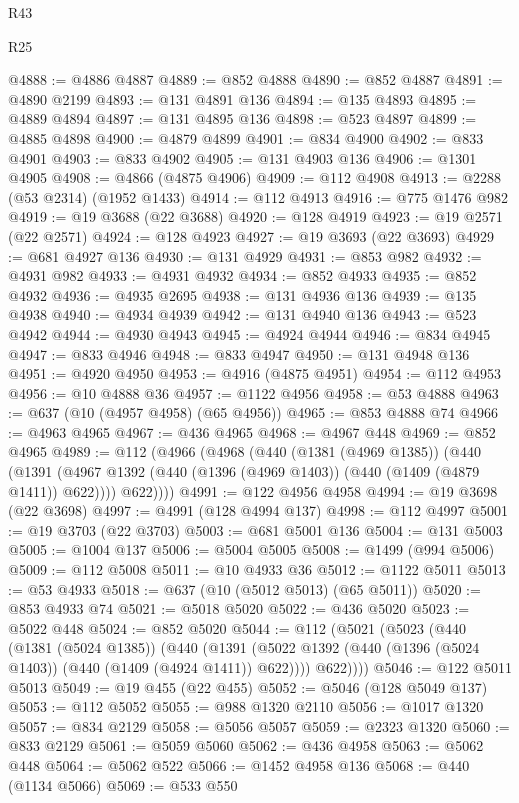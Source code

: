 \begin{lexlean}{R43}
\begin{lexlean}{R25}
\begin{coremodule}
{{{{{{{{{{{{{{{{{{{{{{{{{{{{{{{{{{{{{{{{{{{{{{{{{{{{{{{{{{{{{{{{{{{{{{{{{{{{{{{{{{{{{{{{{{{{{{{{{{{{{{{{{{{{{{{{{{{{{{{{{{{{{{{{{{{{{{{{{{{{{{{{{{{{{{{{{{{{{{{{{{{{{{{{{{{{{{{{{{{{{{{{{{{{{{{{{@4888 := @4886 @4887
@4889 := @852 @4888
@4890 := @852 @4887
@4891 := @4890 @2199
@4893 := @131 @4891 @136
@4894 := @135 @4893
@4895 := @4889 @4894
@4897 := @131 @4895 @136
@4898 := @523 @4897
@4899 := @4885 @4898
@4900 := @4879 @4899
@4901 := @834 @4900
@4902 := @833 @4901
@4903 := @833 @4902
@4905 := @131 @4903 @136
@4906 := @1301 @4905
@4908 := @4866 (@4875 @4906)
@4909 := @112 @4908
@4913 := @2288 (@53 @2314) (@1952 @1433)
@4914 := @112 @4913
@4916 := @775 @1476 @982
@4919 := @19 @3688 (@22 @3688)
@4920 := @128 @4919
@4923 := @19 @2571 (@22 @2571)
@4924 := @128 @4923
@4927 := @19 @3693 (@22 @3693)
@4929 := @681 @4927 @136
@4930 := @131 @4929
@4931 := @853 @982
@4932 := @4931 @982
@4933 := @4931 @4932
@4934 := @852 @4933
@4935 := @852 @4932
@4936 := @4935 @2695
@4938 := @131 @4936 @136
@4939 := @135 @4938
@4940 := @4934 @4939
@4942 := @131 @4940 @136
@4943 := @523 @4942
@4944 := @4930 @4943
@4945 := @4924 @4944
@4946 := @834 @4945
@4947 := @833 @4946
@4948 := @833 @4947
@4950 := @131 @4948 @136
@4951 := @4920 @4950
@4953 := @4916 (@4875 @4951)
@4954 := @112 @4953
@4956 := @10 @4888 @36
@4957 := @1122 @4956
@4958 := @53 @4888
@4963 := @637 (@10 (@4957 @4958) (@65 @4956))
@4965 := @853 @4888 @74
@4966 := @4963 @4965
@4967 := @436 @4965
@4968 := @4967 @448
@4969 := @852 @4965
@4989 := @112
    (@4966
      (@4968
        (@440
          (@1381 (@4969 @1385))
          (@440
            (@1391 (@4967 @1392 (@440 (@1396 (@4969 @1403)) (@440 (@1409 (@4879 @1411)) @622))))
            @622))))
@4991 := @122 @4956 @4958
@4994 := @19 @3698 (@22 @3698)
@4997 := @4991 (@128 @4994 @137)
@4998 := @112 @4997
@5001 := @19 @3703 (@22 @3703)
@5003 := @681 @5001 @136
@5004 := @131 @5003
@5005 := @1004 @137
@5006 := @5004 @5005
@5008 := @1499 (@994 @5006)
@5009 := @112 @5008
@5011 := @10 @4933 @36
@5012 := @1122 @5011
@5013 := @53 @4933
@5018 := @637 (@10 (@5012 @5013) (@65 @5011))
@5020 := @853 @4933 @74
@5021 := @5018 @5020
@5022 := @436 @5020
@5023 := @5022 @448
@5024 := @852 @5020
@5044 := @112
    (@5021
      (@5023
        (@440
          (@1381 (@5024 @1385))
          (@440
            (@1391 (@5022 @1392 (@440 (@1396 (@5024 @1403)) (@440 (@1409 (@4924 @1411)) @622))))
            @622))))
@5046 := @122 @5011 @5013
@5049 := @19 @455 (@22 @455)
@5052 := @5046 (@128 @5049 @137)
@5053 := @112 @5052
@5055 := @988 @1320 @2110
@5056 := @1017 @1320
@5057 := @834 @2129
@5058 := @5056 @5057
@5059 := @2323 @1320
@5060 := @833 @2129
@5061 := @5059 @5060
@5062 := @436 @4958
@5063 := @5062 @448
@5064 := @5062 @522
@5066 := @1452 @4958 @136
@5068 := @440 (@1134 @5066)
@5069 := @533 @550
}}}}}}}}}}}}}}}}}}}}}}}}}}}}}}}}}}}}}}}}}}}}}}}}}}}}}}}}}}}}}}}}}}}}}}}}}}}}}}}}}}}}}}}}}}}}}}}}}}}}}}}}}}}}}}}}}}}}}}}}}}}}}}}}}}}}}}}}}}}}}}}}}}}}}}}}}}}}}}}}}}}}}}}}}}}}}}}}}}}}}}}}}}}}}}}}}
\end{coremodule}
\end{lexlean}
\end{lexlean}
